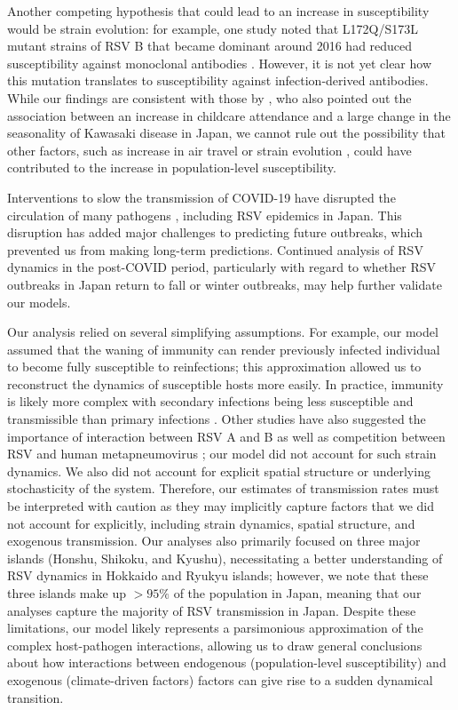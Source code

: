 \documentclass[12pt]{article}
\begin{document}
Another competing hypothesis that could lead to an increase in susceptibility would be strain evolution:
for example, one study noted that L172Q/S173L mutant strains of RSV B that became dominant around 2016 had reduced susceptibility against monoclonal antibodies \citep{okabe2024amino}.
However, it is not yet clear how this mutation translates to susceptibility against infection-derived antibodies.
While our findings are consistent with those by \cite{dehaan2024age}, who also pointed out the association between an increase in childcare attendance and a large change in the seasonality of Kawasaki disease in Japan, we cannot rule out the possibility that other factors, such as increase in air travel \citep{wagatsuma2021shifts} or strain evolution \citep{okabe2024amino}, could have contributed to the increase in population-level susceptibility.

Interventions to slow the transmission of COVID-19 have disrupted the circulation of many pathogens \citep{baker2020impact,eden2022off,chen2024covid,park2024predicting}, including RSV epidemics in Japan.
This disruption has added major challenges to predicting future outbreaks, which prevented us from making long-term predictions.
Continued analysis of RSV dynamics in the post-COVID period, particularly with regard to whether RSV outbreaks in Japan return to fall or winter outbreaks, may help further validate our models.

Our analysis relied on several simplifying assumptions.
For example, our model assumed that the waning of immunity can render previously infected individual to become fully susceptible to reinfections; this approximation allowed us to reconstruct the dynamics of susceptible hosts more easily.
In practice, immunity is likely more complex with secondary infections being less susceptible and transmissible than primary infections \citep{pitzer2015environmental}.
Other studies have also suggested the importance of interaction between RSV A and B \citep{white2005transmission,holmdahl2024differential} as well as competition between RSV and human metapneumovirus \citep{bhattacharyya2015cross}; 
our model did not account for such strain dynamics.
We also did not account for explicit spatial structure or underlying stochasticity of the system.
Therefore, our estimates of transmission rates must be interpreted with caution as they may implicitly capture factors that we did not account for explicitly, including strain dynamics, spatial structure, and exogenous transmission.
Our analyses also primarily focused on three major islands (Honshu, Shikoku, and Kyushu), necessitating a better understanding of RSV dynamics in Hokkaido and Ryukyu islands;
however, we note that these three islands make up $>95\%$ of the population in Japan, meaning that our analyses capture the majority of RSV transmission in Japan.
Despite these limitations, our model likely represents a parsimonious approximation of the complex host-pathogen interactions, allowing us to draw general conclusions about how interactions between endogenous (population-level susceptibility) and exogenous (climate-driven factors) factors can give rise to a sudden dynamical transition.
\end{document}
